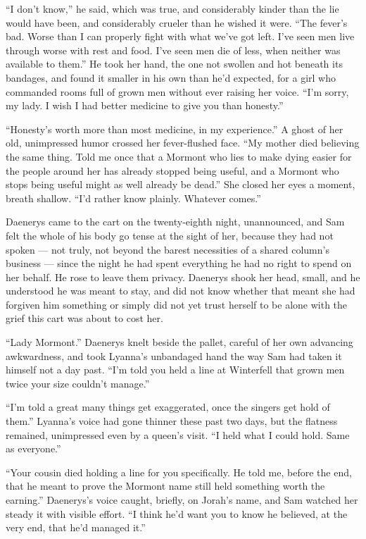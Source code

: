 “I don’t know,” he said, which was true, and considerably kinder than the lie would have been, and considerably crueler than he wished it were. “The fever’s bad. Worse than I can properly fight with what we’ve got left. I’ve seen men live through worse with rest and food. I’ve seen men die of less, when neither was available to them.” He took her hand, the one not swollen and hot beneath its bandages, and found it smaller in his own than he’d expected, for a girl who commanded rooms full of grown men without ever raising her voice. “I’m sorry, my lady. I wish I had better medicine to give you than honesty.”

“Honesty’s worth more than most medicine, in my experience.” A ghost of her old, unimpressed humor crossed her fever-flushed face. “My mother died believing the same thing. Told me once that a Mormont who lies to make dying easier for the people around her has already stopped being useful, and a Mormont who stops being useful might as well already be dead.” She closed her eyes a moment, breath shallow. “I’d rather know plainly. Whatever comes.”

\sceneBreak

Daenerys came to the cart on the twenty-eighth night, unannounced, and Sam felt the whole of his body go tense at the sight of her, because they had not spoken — not truly, not beyond the barest necessities of a shared column’s business — since the night he had spent everything he had no right to spend on her behalf. He rose to leave them privacy. Daenerys shook her head, small, and he understood he was meant to stay, and did not know whether that meant she had forgiven him something or simply did not yet trust herself to be alone with the grief this cart was about to cost her.

“Lady Mormont.” Daenerys knelt beside the pallet, careful of her own advancing awkwardness, and took Lyanna’s unbandaged hand the way Sam had taken it himself not a day past. “I’m told you held a line at Winterfell that grown men twice your size couldn’t manage.”

“I’m told a great many things get exaggerated, once the singers get hold of them.” Lyanna’s voice had gone thinner these past two days, but the flatness remained, unimpressed even by a queen’s visit. “I held what I could hold. Same as everyone.”

“Your cousin died holding a line for you specifically. He told me, before the end, that he meant to prove the Mormont name still held something worth the earning.” Daenerys’s voice caught, briefly, on Jorah’s name, and Sam watched her steady it with visible effort. “I think he’d want you to know he believed, at the very end, that he’d managed it.”

